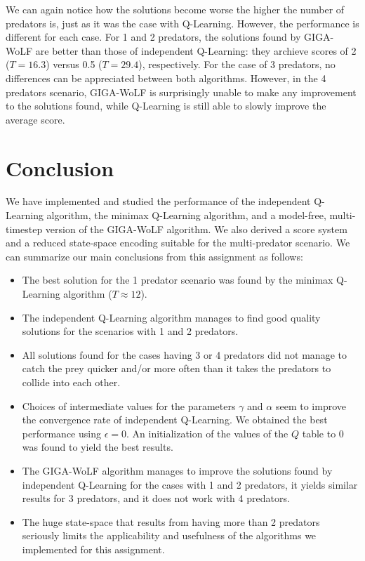\documentclass[a4paper,12pt]{article}
\begin{document}
We can again notice how the solutions become worse the higher the number of predators is, just as it was the case with Q-Learning. However, the performance is different for each case. For 1 and 2 predators, the solutions found by GIGA-WoLF are better than those of independent Q-Learning: they archieve scores of 2 ($T = 16.3 $) versus 0.5 ($T = 29.4$), respectively. For the case of 3 predators, no differences can be appreciated between both algorithms. However, in the 4 predators scenario, GIGA-WoLF is surprisingly unable to make any improvement to the solutions found, while Q-Learning is still able to slowly improve the average score.

\section{Conclusion}

We have implemented and studied the performance of the independent Q-Learning algorithm, the minimax Q-Learning algorithm, and a model-free, multi-timestep version of the GIGA-WoLF algorithm. We also derived a score system and a reduced state-space encoding suitable for the multi-predator scenario. We can summarize our main conclusions from this assignment as follows:

\begin{itemize}
 \item The best solution for the 1 predator scenario was found by the minimax Q-Learning algorithm ($ T \approx 12 $).
 \item The independent Q-Learning algorithm manages to find good quality solutions for the scenarios with 1 and 2 predators.
 \item All solutions found for the cases having 3 or 4 predators did not manage to catch the prey quicker and/or more often than it takes the predators to collide into each other.
 \item Choices of intermediate values for the parameters $\gamma$ and $\alpha$ seem to improve the convergence rate of independent Q-Learning. We obtained the best performance using $\epsilon = 0$. An initialization of the values of the $Q$ table to 0 was found to yield the best results.
 \item The GIGA-WoLF algorithm manages to improve the solutions found by independent Q-Learning for the cases with 1 and 2 predators, it yields similar results for 3 predators, and it does not work with 4 predators.
 \item The huge state-space that results from having more than 2 predators seriously limits the applicability and usefulness of the algorithms we implemented for this assignment. 
\end{itemize}
\end{document}
